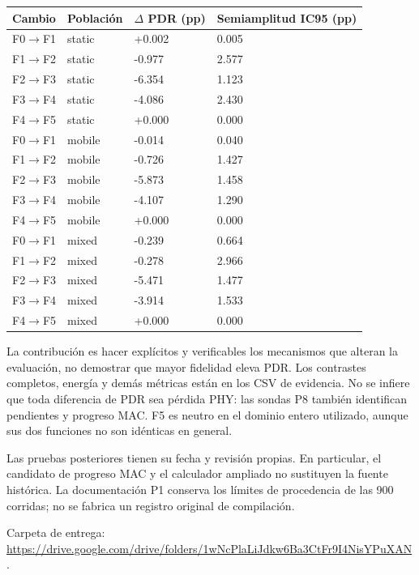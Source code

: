\documentclass[10pt,a4paper]{article}
\begin{document}
\begin{longtable}{llll}\toprule Cambio & Población & $\Delta$ PDR (pp) & Semiamplitud IC95 (pp)\\\midrule\endhead
F0$\to$F1 & static & +0.002 & 0.005\\
F1$\to$F2 & static & -0.977 & 2.577\\
F2$\to$F3 & static & -6.354 & 1.123\\
F3$\to$F4 & static & -4.086 & 2.430\\
F4$\to$F5 & static & +0.000 & 0.000\\
F0$\to$F1 & mobile & -0.014 & 0.040\\
F1$\to$F2 & mobile & -0.726 & 1.427\\
F2$\to$F3 & mobile & -5.873 & 1.458\\
F3$\to$F4 & mobile & -4.107 & 1.290\\
F4$\to$F5 & mobile & +0.000 & 0.000\\
F0$\to$F1 & mixed & -0.239 & 0.664\\
F1$\to$F2 & mixed & -0.278 & 2.966\\
F2$\to$F3 & mixed & -5.471 & 1.477\\
F3$\to$F4 & mixed & -3.914 & 1.533\\
F4$\to$F5 & mixed & +0.000 & 0.000\\
\bottomrule\end{longtable}
La contribución es hacer explícitos y verificables los mecanismos que alteran
la evaluación, no demostrar que mayor fidelidad eleva PDR. Los contrastes
completos, energía y demás métricas están en los CSV de evidencia. No se
infiere que toda diferencia de PDR sea pérdida PHY: las sondas P8 también
identifican pendientes y progreso MAC. F5 es neutro en el dominio entero
utilizado, aunque sus dos funciones no son idénticas en general.

Las pruebas posteriores tienen su fecha y revisión propias. En particular,
el candidato de progreso MAC y el calculador ampliado no sustituyen la fuente
histórica. La documentación P1 conserva los límites de procedencia de las
900 corridas; no se fabrica un registro original de compilación.

Carpeta de entrega: \url{https://drive.google.com/drive/folders/1wNcPlaLiJdkw6Ba3CtFr9I4NisYPuXAN}.
\end{document}
